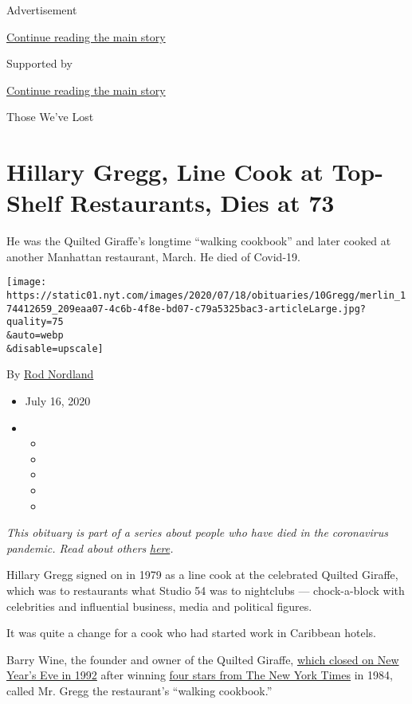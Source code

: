 Advertisement

\protect\hyperlink{after-top}{Continue reading the main story}

Supported by

\protect\hyperlink{after-sponsor}{Continue reading the main story}

Those We've Lost

\hypertarget{hillary-gregg-line-cook-at-top-shelf-restaurants-dies-at-73}{%
\section{Hillary Gregg, Line Cook at Top-Shelf Restaurants, Dies at
73}\label{hillary-gregg-line-cook-at-top-shelf-restaurants-dies-at-73}}

He was the Quilted Giraffe's longtime ``walking cookbook'' and later
cooked at another Manhattan restaurant, March. He died of Covid-19.

\texttt{[image: https://static01.nyt.com/images/2020/07/18/obituaries/10Gregg/merlin\_174412659\_209eaa07-4c6b-4f8e-bd07-c79a5325bac3-articleLarge.jpg?quality=75\\\&auto=webp\\\&disable=upscale]}

By \href{https://www.nytimes.com/by/rod-nordland}{Rod Nordland}

\begin{itemize}
\item
  July 16, 2020
\item
  \begin{itemize}
  \item
  \item
  \item
  \item
  \item
  \end{itemize}
\end{itemize}

\emph{This obituary is part of a series about people who have died in
the coronavirus pandemic. Read about others}
\href{https://www.nytimes.com/interactive/2020/obituaries/people-died-coronavirus-obituaries.html}{\emph{here}}\emph{.}

Hillary Gregg signed on in 1979 as a line cook at the celebrated Quilted
Giraffe, which was to restaurants what Studio 54 was to nightclubs ---
chock-a-block with celebrities and influential business, media and
political figures.

It was quite a change for a cook who had started work in Caribbean
hotels.

Barry Wine, the founder and owner of the Quilted Giraffe,
\href{https://www.nytimes.com/1979/07/20/archives/the-quilted-giraffe.html}{which
closed on New Year's Eve in 1992} after winning
\href{https://www.nytimes.com/1984/01/20/arts/restaurants-187990.html}{four
stars from The New York Times} in 1984, called Mr. Gregg the
restaurant's ``walking cookbook.''

